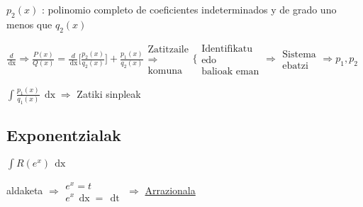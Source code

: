 \documentclass[8pt]{article}
\DeclareMathOperator{\xder}{\, \mathrm{d}x}
\DeclareMathOperator{\tder}{\, \mathrm{d}t}
\begin{document}
			$ p_2 (x) $ : polinomio completo de coeficientes indeterminados y de grado uno menos que $ q_2 (x) $

			$ \frac{d}{\xder} \Rightarrow \frac{P(x)}{Q(x)} = \frac{d}{\xder} 
				\Big[ \frac{p_2 (x)}{q_2 (x)} \Big] + \frac{p_1 (x)}{q_2 (x)}
				\begin{array}{c}
					\text{Zatitzaile}\\
					\Rightarrow\\
					\text{komuna}
				\end{array}
				\Bigg \{
				\begin{array}{c}
					\text{Identifikatu}\\
					\text{edo}\\
					\text{balioak eman}
				\end{array}
				\Rightarrow
				\begin{array}{c}
					\text{Sistema}\\
					\text{ebatzi}
				\end{array} \Rightarrow p_1 , p_2 $

				$ \int \frac{p_1 (x)}{q_1 (x)} \xder \Rightarrow $ Zatiki sinpleak

	\subsection{Exponentzialak}
		$ \int R (e^x) \xder $

			aldaketa $ \Rightarrow
			\begin{array}{c}
				e^x = t\\
				e^x \xder = \tder
			\end{array}
			\Rightarrow $ \underline{Arrazionala}
\end{document}
